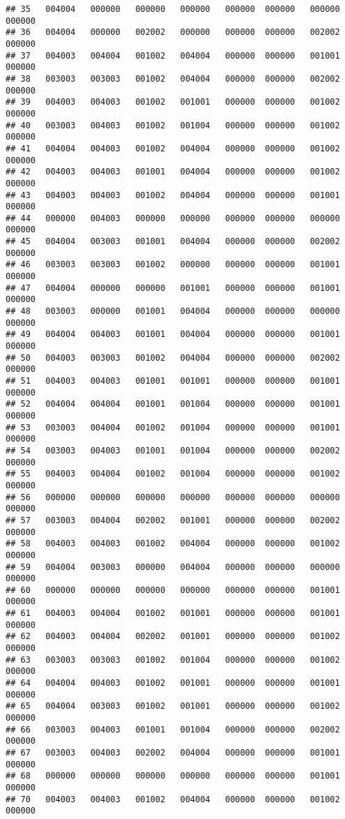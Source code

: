 \documentclass[
]{article}
\begin{document}
\begin{verbatim}
## 35   004004   000000   000000   000000   000000  000000   000000  000000
## 36   004004   000000   002002   000000   000000  000000   002002  000000
## 37   004003   004004   001002   004004   000000  000000   001001  000000
## 38   003003   003003   001002   004004   000000  000000   002002  000000
## 39   004003   004003   001002   001001   000000  000000   001002  000000
## 40   003003   004003   001002   001004   000000  000000   001002  000000
## 41   004004   004003   001002   004004   000000  000000   001002  000000
## 42   004003   004003   001001   004004   000000  000000   001002  000000
## 43   004003   004003   001002   004004   000000  000000   001001  000000
## 44   000000   004003   000000   000000   000000  000000   000000  000000
## 45   004004   003003   001001   004004   000000  000000   002002  000000
## 46   003003   003003   001002   000000   000000  000000   001001  000000
## 47   004004   000000   000000   001001   000000  000000   001001  000000
## 48   003003   000000   001001   004004   000000  000000   000000  000000
## 49   004004   004003   001001   004004   000000  000000   001001  000000
## 50   004003   003003   001002   004004   000000  000000   002002  000000
## 51   004003   004003   001001   001001   000000  000000   001001  000000
## 52   004004   004004   001001   001004   000000  000000   001001  000000
## 53   003003   004004   001002   001004   000000  000000   001001  000000
## 54   003003   004003   001001   001004   000000  000000   002002  000000
## 55   004003   004004   001002   001004   000000  000000   001002  000000
## 56   000000   000000   000000   000000   000000  000000   000000  000000
## 57   003003   004004   002002   001001   000000  000000   002002  000000
## 58   004003   004003   001002   004004   000000  000000   001002  000000
## 59   004004   003003   000000   004004   000000  000000   000000  000000
## 60   000000   000000   000000   000000   000000  000000   001001  000000
## 61   004003   004004   001002   001001   000000  000000   001001  000000
## 62   004003   004004   002002   001001   000000  000000   001002  000000
## 63   003003   003003   001002   001004   000000  000000   001002  000000
## 64   004004   004003   001002   001001   000000  000000   001001  000000
## 65   004004   003003   001002   001001   000000  000000   001002  000000
## 66   003003   004003   001001   001004   000000  000000   002002  000000
## 67   003003   004003   002002   004004   000000  000000   001001  000000
## 68   000000   000000   000000   000000   000000  000000   001001  000000
## 70   004003   004003   001002   004004   000000  000000   001002  000000

\end{verbatim}
\end{document}
